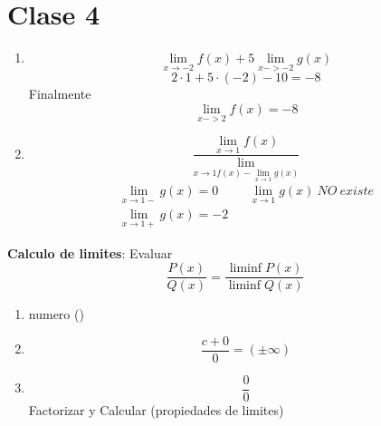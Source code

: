 \documentclass{article}
\begin{document}
    \section{Clase 4}
    \begin{enumerate}
        \item 
        \begin{equation}
            \lim_{x\rightarrow-2} f(x) + 5 \lim_{x->-2}g(x)
        \end{equation}
        \begin{equation}
            2 \cdot 1 + 5 \cdot (-2) - 10 = -8
        \end{equation}
        Finalmente
        \begin{equation}
            \lim_{x->2} f(x) = -8
        \end{equation}
        \item \begin{equation}
            \frac{\lim_{x\rightarrow1}f(x)}{\lim_{x\rightarrow1 f(x)- \lim_{x\rightarrow1}g(x)}}
        \end{equation}
        \begin{equation}
            \begin{aligned}
                  \lim_{x\rightarrow1-}g(x)=0 && \lim_{x\rightarrow1}g(x)\  NO \ existe \\ 
                \lim_{x\rightarrow1+}g(x)=-2&&
            \end{aligned}
        \end{equation}

    \end{enumerate}
    \textbf{Calculo de limites}:
    Evaluar
        \begin{equation}
            \frac{P(x)}{Q(x)} = \frac{\liminf P(x)}{\liminf Q(x)}
        \end{equation}
    \begin{enumerate}
        
        \item numero ()
        \item \begin{equation}
            \frac{c+0}{0} = (\pm \infty )
        \end{equation}
        \item \begin{equation}
            \frac{0}{0}
        \end{equation} Factorizar y Calcular (propiedades de limites)
    \end{enumerate}
               
\end{document}
